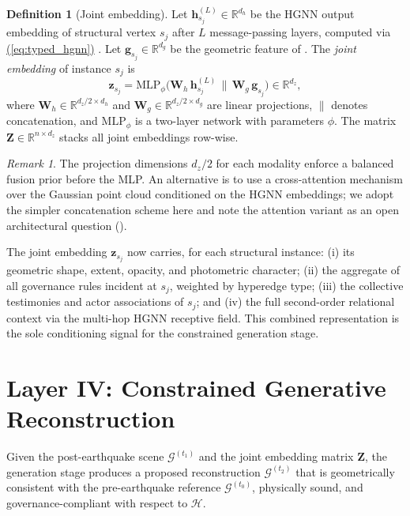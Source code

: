 \documentclass[11pt,a4paper]{article}
\renewcommand{\eqref}[1]{%
    \hyperref[#1]{\textcolor{eqred}{(\ref*{#1})}}%
}
\theoremstyle{plain}
\theoremstyle{definition}
\newtheorem{definition}[theorem]{Definition}
\theoremstyle{remark}
\newtheorem{remark}[theorem]{Remark}
\newcommand{\GS}{\mathcal{G}}
\newcommand{\HG}{\mathcal{H}}
\newcommand{\gvec}{\mathbf{g}}
\newcommand{\hvec}{\mathbf{h}}
\newcommand{\zvec}{\mathbf{z}}
\begin{document}
\begin{definition}[Joint embedding]
\label{def:joint_embed}
Let $\hvec_{s_j}^{(L)} \in \mathbb{R}^{d_h}$ be the HGNN output
embedding of structural vertex $s_j$ after $L$ message-passing layers,
computed via \eqref{eq:typed_hgnn}. Let
$\gvec_{s_j} \in \mathbb{R}^{d_g}$ be the geometric feature of
. The \emph{joint embedding} of instance $s_j$
is
\begin{equation}
  \zvec_{s_j}
  = \text{MLP}_\phi\!\bigl(
      \mathbf{W}_h\,\hvec_{s_j}^{(L)} \,\|\, \mathbf{W}_g\,\gvec_{s_j}
    \bigr)
    \in \mathbb{R}^{d_z},
  \label{eq:joint_embed}
\end{equation}
where $\mathbf{W}_h \in \mathbb{R}^{d_z/2 \times d_h}$ and
$\mathbf{W}_g \in \mathbb{R}^{d_z/2 \times d_g}$ are linear
projections, $\|$ denotes concatenation, and $\text{MLP}_\phi$
is a two-layer network with parameters $\phi$. The matrix
$\mathbf{Z} \in \mathbb{R}^{n \times d_z}$ stacks all joint
embeddings row-wise.
\end{definition}

\begin{remark}
The projection dimensions $d_z/2$ for each modality enforce a balanced
fusion prior before the MLP. An alternative is to use a cross-attention
mechanism over the Gaussian point cloud conditioned on the HGNN
embeddings; we adopt the simpler concatenation scheme here and note
the attention variant as an open architectural question
().
\end{remark}

The joint embedding $\zvec_{s_j}$ now carries, for each structural
instance: (i) its geometric shape, extent, opacity, and photometric
character; (ii) the aggregate of all governance rules incident at
$s_j$, weighted by hyperedge type; (iii) the collective testimonies
and actor associations of $s_j$; and (iv) the full second-order
relational context via the multi-hop HGNN receptive field. This
combined representation is the sole conditioning signal for the
constrained generation stage.

\section{Layer IV: Constrained Generative Reconstruction}
\label{sec:layer4}

Given the post-earthquake scene $\GS^{(t_1)}$ and the joint embedding
matrix $\mathbf{Z}$, the generation stage produces a proposed
reconstruction $\GS^{(t_2)}$ that is geometrically consistent with
the pre-earthquake reference $\GS^{(t_0)}$, physically sound, and
governance-compliant with respect to $\HG$.
\end{document}
